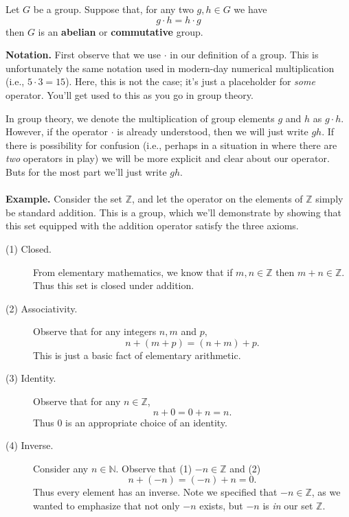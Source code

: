 \begin{definition}
    Let $G$ be a group. Suppose that, for any two $g, h \in G$
    we have 
    \[
        g \cdot h = h \cdot g  
    \]
    then $G$ is an \textbf{abelian} or \textbf{commutative} group.
\end{definition}

\textbf{Notation.} 
First observe that we use $\cdot$ in our definition of a group. This
is unfortunately the same notation used in modern-day numerical
multiplication (i.e., $5 \cdot 3 = 15$). Here, this is not the case;
it's just a placeholder for \textit{some} operator. You'll get used
to this as you go in group theory.

In group theory, we denote the multiplication of
group elements $g$ and $h$ as $g \cdot h$. However, if the operator
$\cdot$ is already understood, then we will just write $gh$. If there
is possibility for confusion (i.e., perhaps in a situation in where
there are \textit{two} operators in play) we will be more explicit and
clear about our operator. Buts for the most part we'll just write $gh$.
\\
\\
\noindent
\textbf{Example.} Consider the set $\mathbb{Z}$, and let the operator
on the elements of $\mathbb{Z}$ simply be standard addition. This is a
group, which we'll demonstrate by showing that this set equipped with
the addition operator
satisfy the three axioms.
\begin{description}
    \item[(1) Closed.] From elementary mathematics, we know that if
    $m, n \in \mathbb{Z}$ then $m + n \in \mathbb{Z}$. Thus this set
    is closed under addition.

    \item[(2) Associativity.] Observe that for any integers $n, m $
    and $p$, 
    \[
        n + (m + p) = (n + m) + p.
    \]
    This is just a basic fact of elementary arithmetic.

    \item[(3) Identity.] Observe that for any $n \in \mathbb{Z}$, 
    \[
        n + 0 = 0 + n = n.        
    \]
    Thus 0 is an appropriate choice of an identity. 

    \item[(4) Inverse.] Consider any $n \in \mathbb{N}$. Observe that 
    (1) $-n \in \mathbb{Z}$ and (2) 
    \[
        n + (-n) = (-n) + n = 0.
    \] 
    Thus every element has an inverse. Note we specified that $-n \in
    \mathbb{Z}$, as we wanted to emphasize that not only $-n$ exists,
    but $-n$ is \textit{in} our set $\mathbb{Z}$.    

\end{description}

